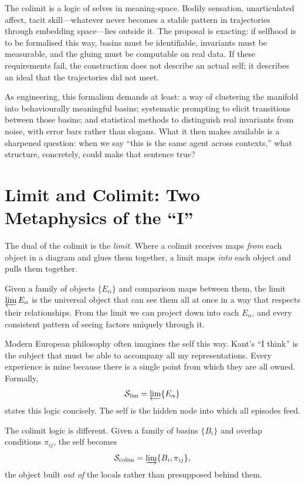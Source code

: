 \documentclass[12pt,a4paper]{article}
\begin{document}
The colimit is a logic of selves in meaning-space. Bodily sensation, unarticulated affect, tacit skill---whatever never becomes a stable pattern in trajectories through embedding space---lies outside it. The proposal is exacting: if selfhood is to be formalised this way, basins must be identifiable, invariants must be measurable, and the gluing must be computable on real data. If these requirements fail, the construction does not describe an actual self; it describes an ideal that the trajectories did not meet.

As engineering, this formalism demands at least: a way of clustering the manifold into behaviourally meaningful basins; systematic prompting to elicit transitions between those basins; and statistical methods to distinguish real invariants from noise, with error bars rather than slogans. What it then makes available is a sharpened question: when we say ``this is the same agent across contexts,'' what structure, concretely, could make that sentence true?

\section{Limit and Colimit: Two Metaphysics of the ``I''}

The dual of the colimit is the \emph{limit}. Where a colimit receives maps \emph{from} each object in a diagram and glues them together, a limit maps \emph{into} each object and pulls them together.

Given a family of objects $\{E_\alpha\}$ and comparison maps between them, the limit $\varprojlim E_\alpha$ is the universal object that can see them all at once in a way that respects their relationships. From the limit we can project down into each $E_\alpha$, and every consistent pattern of seeing factors uniquely through it.

Modern European philosophy often imagines the self this way. Kant's ``I think'' is the subject that must be able to accompany all my representations. Every experience is mine because there is a single point from which they are all owned. Formally,
\[
\mathcal{S}_{\mathrm{lim}} = \varprojlim \{E_\alpha\}
\]
states this logic concisely. The self is the hidden node into which all episodes feed.

The colimit logic is different. Given a family of basins $\{B_i\}$ and overlap conditions $\pi_{ij}$, the self becomes
\[
\mathcal{S}_{\mathrm{colim}} = \varinjlim \{B_i, \pi_{ij}\},
\]
the object built \emph{out of} the locals rather than presupposed behind them.
\end{document}
